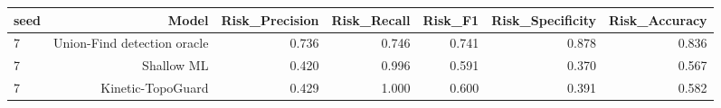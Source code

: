 \begin{tabular}{lrrrrrr}
\toprule
seed & Model & Risk\_Precision & Risk\_Recall & Risk\_F1 & Risk\_Specificity & Risk\_Accuracy \\
\midrule
7 & Union-Find detection oracle & 0.736 & 0.746 & 0.741 & 0.878 & 0.836 \\
7 & Shallow ML & 0.420 & 0.996 & 0.591 & 0.370 & 0.567 \\
7 & Kinetic-TopoGuard & 0.429 & 1.000 & 0.600 & 0.391 & 0.582 \\
\bottomrule
\end{tabular}